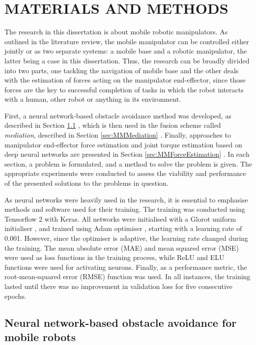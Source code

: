 \chapter{MATERIALS AND METHODS}
\label{chap:Materials}

The research in this dissertation is about mobile robotic manipulators. As outlined in the literature review, the mobile manipulator can be controlled either jointly or as two separate systems: a mobile base and a robotic manipulator, the latter being a case in this dissertation. Thus, the research can be broadly divided into two parts, one tackling the navigation of mobile base and the other deals with the estimation of forces acting on the manipulator end-effector, since those forces are the key to successful completion of tasks in which the robot interacts with a human, other robot or anything in its environment. 

First, a neural network-based obstacle avoidance method was developed, as described in Section \ref{sec:MMAvoidance} \cite{Kruzic2020}, which is then used in the fusion scheme called \emph{mediation}, described in Section \ref{sec:MMMediation} \cite{Music2019}. Finally, approaches to manipulator end-effector force estimation and joint torque estimation based on deep neural networks are presented in Section \ref{sec:MMForceEstimation} \cite{Kruzic2020a}. In each section, a problem is formulated, and a method to solve the problem is given. The appropriate experiments were conducted to assess the viability and performance of the presented solutions to the problems in question.

As neural networks were heavily used in the research, it is essential to emphasise methods and software used for their training. The training was conducted using Tensorflow 2 with Keras. All networks were initialised with a Glorot uniform initialiser \cite{Glorot2010}, and trained using Adam optimiser \cite{Kingma2014}, starting with a learning rate of 0.001. However, since the optimiser is adaptive, the learning rate changed during the training. The mean absolute error (MAE) and mean squared error (MSE) were used as loss functions in the training process, while ReLU and ELU functions were used for activating neurons. Finally, as a performance metric, the root-mean-squared error (RMSE) function was used. In all instances, the training lasted until there was no improvement in validation loss for five consecutive epochs. 


\section{Neural network-based obstacle avoidance for mobile robots}
\label{sec:MMAvoidance}

